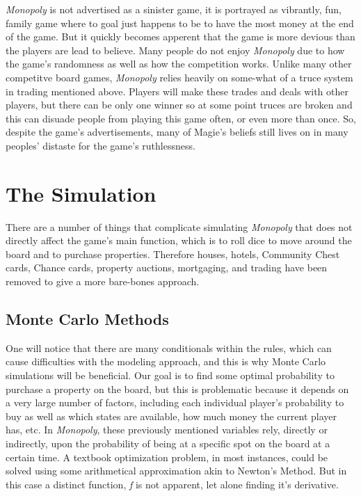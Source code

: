 \documentclass{article}
\begin{document}
\textit{Monopoly} is not advertised as a sinister game, it is portrayed as vibrantly, fun, family game where to goal just happens to be to have the most money at the end of the game.  But it quickly becomes apperent that the game is more devious than the players are lead to believe.  Many people do not enjoy \textit{Monopoly} due to how the game's randomness as well as how the competition works.  Unlike many other competitve board games, \textit{Monopoly} relies heavily on some-what of a truce system in trading mentioned above.  Players will make these trades and deals with other players, but there can be only one winner so at some point truces are broken and this can disuade people from playing this game often, or even more than once.  So, despite the game's advertisements, many of Magie's beliefs still lives on in many peoples' distaste for the game's ruthlessness.

\section{The Simulation}

There are a number of things that complicate simulating \textit{Monopoly} that does not directly affect the game’s main function, which is to roll dice to move around the board and to purchase properties.  Therefore houses, hotels, Community Chest cards, Chance cards, property auctions, mortgaging, and trading have been removed to give a more bare-bones approach.

\subsection{Monte Carlo Methods}

One will notice that there are many conditionals within the rules, which can cause difficulties with the modeling approach, and this is why Monte Carlo simulations will be beneficial.  Our goal is to find some optimal probability to purchase a property on the board, but this is problematic because it depends on a very large number of factors, including each individual player’s probability to buy as well as which states are available, how much money the current player has, etc.  In \textit{Monopoly}, these previously mentioned variables rely, directly or indirectly, upon the probability of being at a specific spot on the board at a certain time.  A textbook optimization problem, in most instances, could be solved using some arithmetical approximation akin to Newton's Method.  But in this case a distinct function, \textit{f} is not apparent, let alone finding it's derivative.
\end{document}
